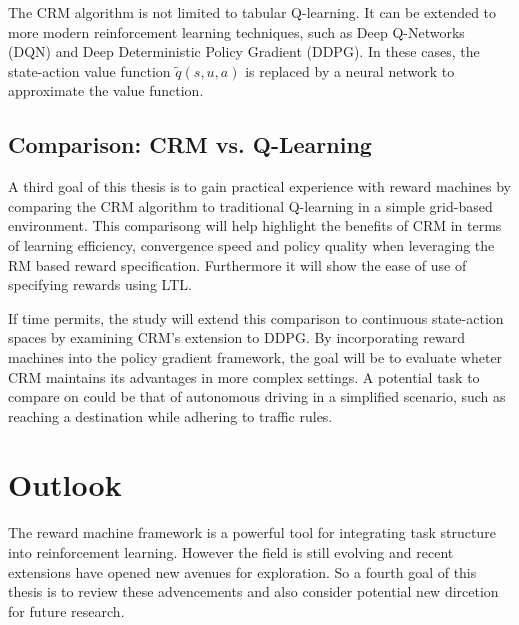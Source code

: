 \documentclass[12pt, a4paper]{article}
\begin{document}
The CRM algorithm is not limited to tabular Q-learning. It can be extended to more modern reinforcement learning techniques, such as Deep Q-Networks (DQN) and Deep Deterministic Policy Gradient (DDPG). In these cases, the state-action value function $\tilde{q}(s, u, a)$ is replaced by a neural network to approximate the value function.


\subsection*{Comparison: CRM vs. Q-Learning}

A third goal of this thesis is to gain practical experience with reward machines by comparing the CRM algorithm to traditional Q-learning in a simple grid-based environment. This comparisong will help highlight the benefits of CRM in terms of learning efficiency, convergence speed and policy quality when leveraging the RM based reward specification. Furthermore it will show the ease of use of specifying rewards using LTL.

If time permits, the study will extend this comparison to continuous state-action spaces by examining CRM's extension to DDPG. By incorporating reward machines into the policy gradient framework, the goal will be to evaluate wheter CRM maintains its advantages in more complex settings. A potential task to compare on could be that of autonomous driving in a simplified scenario, such as reaching a destination while adhering to traffic rules.


\section*{Outlook}

The reward machine framework is a powerful tool for integrating task structure into reinforcement learning. However the field is still evolving and recent extensions have opened new avenues for exploration. So a fourth goal of this thesis is to review these advencements and also consider potential new dircetion for future research.
\end{document}
